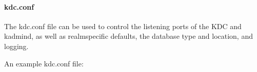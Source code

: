 \documentclass[letterpaper,10pt,english]{sphinxmanual}
\begin{document}
\begin{sphinxVerbatim}[commandchars=\\\{\}]
\PYG{p}{[}\PYG{p}{]}
      

\PYG{p}{[}\PYG{p}{]}
      
          
          
          
\end{sphinxVerbatim}


\paragraph{kdc.conf}
\label{\detokenize{admin/install_kdc:kdc-conf}}
\sphinxAtStartPar
The kdc.conf file can be used to control the listening ports of the
KDC and kadmind, as well as realm\sphinxhyphen{}specific defaults, the database type
and location, and logging.

\sphinxAtStartPar
An example kdc.conf file:
\end{document}
